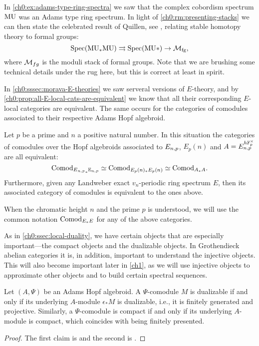 \begin{remark}
    In \cref{ch0:ex:adams-type-ring-spectra} we saw that the complex cobordism spectrum $\mathrm{MU}$ was an Adams type ring spectrum. In light of \cref{ch0:rm:presenting-stacks} we can then state the celebrated result of Quillen, see \cite{quillen_1969}, relating stable homotopy theory to formal groups:
    \[\mathrm{Spec}(\mathrm{MU}_*\mathrm{MU})\rightrightarrows \mathrm{Spec}(\mathrm{MU}*)\rightarrow \mathcal{M}_{\mathrm{fg}},\]
    where $\mathcal{M}_{fg}$ is the moduli stack of formal groups. Note that we are brushing some technical details under the rug here, but this is correct at least in spirit. 
\end{remark}

In \cref{ch0:sssec:morava-E-theories} we saw serveral versions of $E$-theory, and by \cref{ch0:prop:all-E-local-cats-are-equivalent} we know that all their corresponding $E$-local categories are equivalent. The same occurs for the categories of comodules associated to their respective Adams Hopf algebroid.

\begin{proposition}
    Let $p$ be a prime and $n$ a positive natural number. In this situation the categories of comodules over the Hopf algebroids associated to $E_{n,p}$, $E_p(n)$ and $A = E_{n,p}^{h\mathbb{F}_p^\times}$ are all equivalent: 
    \[\mathrm{Comod}_{E{_{n,p}}_*\mathbb{E}_{n,p}}\simeq \mathrm{Comod}_{E_p(n)_*E_p(n)}\simeq \mathrm{Comod}_{A_*A}.\]
    Furthermore, given any Landweber exact $v_n$-periodic ring spectrum $E$, then its associated category of comodules is equivalent to the ones above. 
\end{proposition}

\begin{notation}
    When the chromatic height $n$ and the prime $p$ is understood, we will use the common notation $\mathrm{Comod}_{E_*E}$ for any of the above categories. 
\end{notation}

As in \cref{ch0:ssec:local-duality}, we have certain objects that are especially important---the compact objects and the dualizable objects. In Grothendieck abelian categories it is, in addition, important to understand the injective objects. This will also become important later in \cref{ch1}, as we will use injective objects to approximate other objects and to build certain spectral sequences.  

\begin{proposition}
    \label{ch0:rm:dualizable/compact-comodules}
    Let $(A, \Psi)$ be an Adams Hopf algebroid. A $\Psi$-comodule $M$ is dualizable if and only if its underlying $A$-module $\epsilon_* M$ is dualizable, i.e., it is finitely generated and projective. Similarly, a $\Psi$-comodule is compact if and only if its underlying $A$-module is compact, which coincides with being finitely presented. 
\end{proposition}
\begin{proof}
    The first claim is \cite[1.3.4]{hovey_04} and the second is \cite[1.4.2]{hovey_04}. 
\end{proof}

